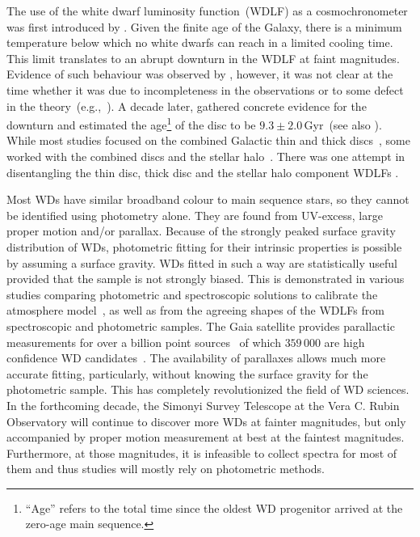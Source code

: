 \documentclass[fleqn,usenatbib]{rasti}
\begin{document}
The use of the white dwarf luminosity function~(WDLF) as a cosmochronometer was
first introduced by \citet{1959ApJ...129..243S}. Given the finite age of the
Galaxy, there is a minimum temperature below which no white dwarfs can reach in
a limited cooling time. This limit translates to an abrupt downturn in the WDLF
at faint magnitudes. Evidence of such behaviour was observed by
\citet{1979ApJ...233..226L}, however, it was not clear at the time whether it
was due to incompleteness in the observations or to some defect in the
theory~(e.g.,~\citealp{1984ApJ...282..615I}). A decade later,
\citet{1987ApJ...315L..77W} gathered concrete evidence for the downturn and
estimated the age\footnote{``Age'' refers to the total time since the oldest
WD progenitor arrived at the zero-age main sequence.} of the disc to be
$9.3 \pm 2.0$\,Gyr~(see also \citealt{1988ApJ...332..891L}). While most studies
focused on the combined Galactic thin and thick discs~\citep{1989LNP...328...15L,
1992ApJ...386..539W, 1995LNP...443...24O, 1998ApJ...497..294L, 1999MNRAS.306..736K,
2012ApJS..199...29G, 2021A&A...649A...6G}, some worked with the combined discs
and the stellar halo~\citep{2006AJ....131..571H, 2017AJ....153...10M,
2019MNRAS.482..715L}. There was one attempt in disentangling the thin disc,
thick disc and the stellar halo component WDLFs \citep{2011MNRAS.417...93R}.
 
Most WDs have similar broadband colour to main sequence stars,
so they cannot be identified using photometry alone. They are
found from UV-excess, large proper motion and/or parallax. Because of the
strongly peaked surface gravity distribution of WDs, photometric fitting for
their intrinsic properties is possible by assuming a surface gravity. WDs
fitted in such a way are statistically useful provided that the
sample is not
strongly biased. This is demonstrated in various studies comparing photometric
and spectroscopic solutions to calibrate the atmosphere
model~\citep{2019ApJ...871..169G, 2019ApJ...882..106G}, as well as from the
agreeing shapes of the WDLFs from spectroscopic and photometric samples. The
Gaia satellite provides parallactic measurements for over a billion point
sources~\citep{2021A&A...649A...1G, 2021AJ....161..147B} of which $359\,000$
are high confidence WD candidates~\citep[][hereafter, GF21]{2021MNRAS.508.3877G}.
The availability of parallaxes allows much more accurate fitting, particularly,
without knowing the surface gravity for the photometric sample. This has
completely  revolutionized the field of WD sciences. In the forthcoming decade,
the Simonyi Survey Telescope at the Vera C. Rubin Observatory will continue to
discover more WDs at fainter magnitudes, but only accompanied by proper
motion measurement at best at the faintest magnitudes.
Furthermore, at those magnitudes, it is infeasible to collect spectra for most
of them and thus studies will mostly rely on photometric methods.
\end{document}
